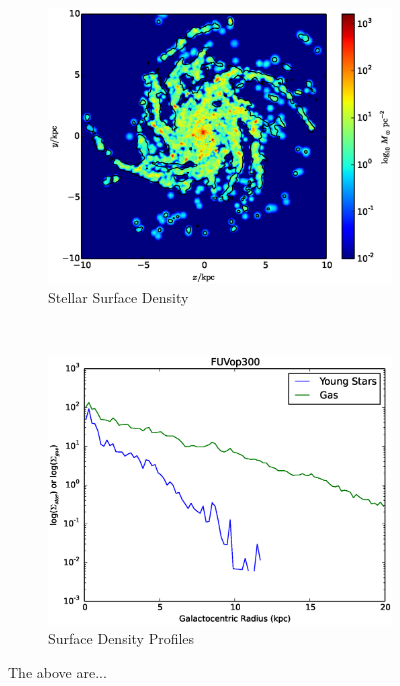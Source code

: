 \begin{figure}
\begin{subfigure}[b]{0.45\textwidth}
                \label{fig:op300intensity}
        \end{subfigure}
        \\
        \begin{subfigure}[b]{0.45\textwidth}
                \includegraphics[width=\textwidth]{graphics/stellardensityRadFUV_J300200.eps}
                \caption{Stellar Surface Density}
                \label{fig:op300stellar}
        \end{subfigure}
        ~
        \begin{subfigure}[b]{0.45\textwidth}
                \includegraphics[width=\textwidth]{graphics/stellarsigmaRadFUV_J300200.eps}
                \caption{Surface Density Profiles}
                \label{fig:op300sigma}
        \end{subfigure}
        \caption[FUVop300 Images and profiles]{The above are...}
        \label{fig:op300detail}
\end{figure}

